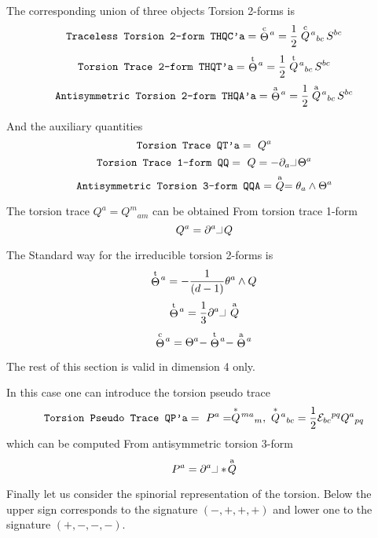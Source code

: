 \documentclass[twoside,openright]{report}
\newcommand{\grgtt}{\ttfamily}
\newcommand{\object}[2]{%
\begin{equation}
\mbox{\comm{#1}} =\ #2
\end{equation}}
\newcommand{\ipr}{\rule{1.8mm}{.1mm}\rule{.1mm}{2.2mm}\,} %
\newcommand{\pref}[1]{page \pageref{#1}}
\newcommand{\seethis}[1]{\marginpar{\footnotesize\it #1}}
\renewcommand{\tt}{\grgtt}
\newcommand{\comm}[1]{{\upshape\tt#1}}    %
\begin{document}
The corresponding union of three objects {\tt Torsion 2-forms} is
\object{Traceless Torsion 2-form       THQC'a}
{\stackrel{\rm c}{\Theta}\!{}^a=\frac{1}{2}
 \stackrel{\rm c}{Q}\!{}^a{}_{bc}\,S^{bc}}
\object{Torsion Trace 2-form           THQT'a}
{\stackrel{\rm t}{\Theta}\!{}^a=\frac{1}{2}
 \stackrel{\rm t}{Q}\!{}^a{}_{bc}\,S^{bc}}
\object{Antisymmetric Torsion 2-form   THQA'a}
{\stackrel{\rm a}{\Theta}\!{}^a=\frac{1}{2}
 \stackrel{\rm a}{Q}\!{}^a{}_{bc}\,S^{bc}}

And the auxiliary quantities
\object{Torsion Trace  QT'a}{Q^a}
\object{Torsion Trace 1-form  QQ}{Q=-\partial_a\ipr\Theta^a}
\object{Antisymmetric Torsion 3-form QQA}{\stackrel{\rm a}{Q}=\theta_a\wedge\Theta^a}

The torsion trace $Q^a=Q^m{}_{am}$ can be obtained {\tt From torsion
trace 1-form}
\begin{equation}
Q^a = \partial^a\ipr Q
\end{equation}

The {\tt Standard way} for the irreducible torsion 2-forms is
\begin{equation}
\stackrel{\rm t}{\Theta}\!{}^a = -\frac{1}{(d-1)}\theta^a\wedge Q
\end{equation}
\begin{equation}
\stackrel{\rm t}{\Theta}\!{}^a = \frac{1}{3}\partial^a\ipr\stackrel{\rm a}{Q}
\end{equation}
\begin{equation}
\stackrel{\rm c}{\Theta}\!{}^a = \Theta^a
-\stackrel{\rm t}{\Theta}\!{}^a
-\stackrel{\rm a}{\Theta}\!{}^a
\end{equation}

The rest of this section is valid in dimension 4 only.

In this case one can introduce the torsion pseudo trace
\object{Torsion Pseudo Trace QP'a}{
P^a = \stackrel{*}{Q}\!{}^{ma}{}_{m},
\ \stackrel{*}{Q}\!{}^a{}_{bc} = \frac{1}{2}{\cal E}_{bc}{}^{pq}
Q^a{}_{pq}}
which can be computed {\tt From antisymmetric torsion 3-form}
\begin{equation}
P^a = \partial^a\ipr\,*\!\stackrel{\rm a}{Q}
\end{equation}

Finally let us consider the spinorial representation of the
torsion.
Below the upper sign corresponds to the
\seethis{See \pref{spinors}\ or \ref{spinors1}.}
signature ${\scriptstyle(-,+,+,+)}$ and lower one to the
signature ${\scriptstyle(+,-,-,-)}$.
\end{document}
